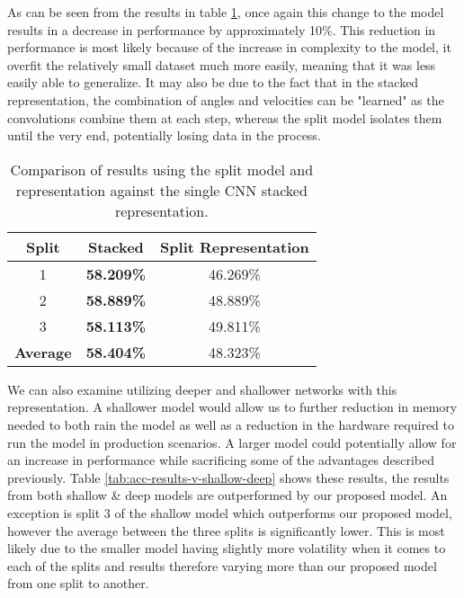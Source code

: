 As can be seen from the results in table \ref{tab:acc-results-v-split}, once again this change to the model results in a decrease in performance by approximately 10\%. This reduction in performance is most likely because of the increase in complexity to the model, it overfit the relatively small dataset much more easily, meaning that it was less easily able to generalize. It may also be due to the fact that in the stacked representation, the combination of angles and velocities can be "learned" as the convolutions combine them at each step, whereas the split model isolates them until the very end, potentially losing data in the process.

\begin{table}[ht]
	\centering
	\begin{tabular}{||c c c||} 
		\hline
		\textbf{Split} & \textbf{Stacked} & \textbf{Split Representation} \\ [0.5ex] 
		\hline\hline
		1 & \textbf{58.209\%} & 46.269\% \\ 
		\hline
		2 & \textbf{58.889\%} & 48.889\% \\
		\hline
		3 & \textbf{58.113\%} & 49.811\% \\
		\hline
		\hline
		\textbf{Average} & \textbf{58.404\%} & 48.323\% \\
		\hline
	\end{tabular}
	\caption{Comparison of results using the split model and representation against the single CNN stacked representation.}
	\label{tab:acc-results-v-split}
\end{table}

We can also examine utilizing deeper and shallower networks with this representation. A shallower model would allow us to further reduction in memory needed to both rain the model as well as a reduction in the hardware required to run the model in production scenarios. A larger model could potentially allow for an increase in performance while sacrificing some of the advantages described previously. Table \ref{tab:acc-results-v-shallow-deep} shows these results, the results from both shallow \& deep models are outperformed by our proposed model. An exception is split 3 of the shallow model which outperforms our proposed model, however the average between the three splits is significantly lower. This is most likely due to the smaller model having slightly more volatility when it comes to each of the splits and results therefore varying more than our proposed model from one split to another.

